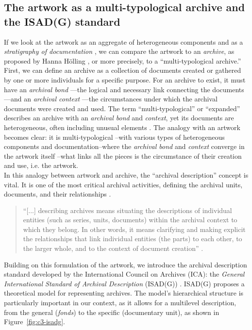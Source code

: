 \subsection{The artwork as a multi-typological archive and the ISAD(G) standard}
If we look at the artwork as an aggregate of heterogeneous components and as a \textit{stratigraphy of documentation} \cite{holling2016aesthetics}, we can compare the artwork to an \textit{archive}, as proposed by Hanna Hölling \cite{holling2017paik}, or more precisely, to a ``multi-typological archive.''\\
First, we can define an archive as a collection of documents created or gathered by one or more individuals for a specific purpose. For an archive to exist, it must have an \textit{archival bond} \cite{de1988archivio}—the logical and necessary link connecting the documents—and an \textit{archival context} \cite{pitti2003descrizione}—the circumstances under which the archival documents were created and used. The term ``multi-typological'' or ``expanded'' describes an archive with an \textit{archival bond} and \textit{context}, yet its documents are heterogeneous, often including unusual elements \cite{brunetti2018archivio}. The analogy with an artwork becomes clear: it is multi-typological –with various types of heterogeneous components and documentation–where the \textit{archival bond} and \textit{context} converge in the artwork itself –what links all the pieces is the circumstance of their creation and use, i.e. the artwork.\\
In this analogy between artwork and archive, the ``archival description'' concept is vital. It is one of the most critical archival activities, defining the archival units, documents, and their relationships \cite{brunetti2018archivio}.
\begin{quote}
“[...] describing archives means situating the descriptions of individual entities (such as series, units, documents) within the archival context to which they belong. In other words, it means clarifying and making explicit the relationships that link individual entities (the parts) to each other, to the larger whole, and to the context of document creation” \cite{vitali2000standard}.
\end{quote}
Building on this formulation of the artwork, we introduce the archival description standard developed by the International Council on Archives (ICA): the \textit{General International Standard of Archival Description} (ISAD(G)) \cite{ica1999general}. ISAD(G) proposes a theoretical model for representing archives. The model's hierarchical structure is particularly important in our context, as it allows for a multilevel description, from the general (\textit{fonds}) to the specific (documentary unit), as shown in Figure~\ref{fig:c3-isadg}.


